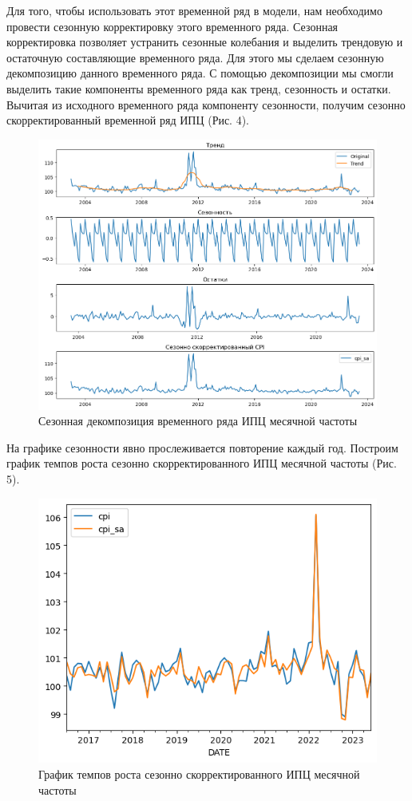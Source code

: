 \documentclass[a4paper, 14pt]{extarticle}
\begin{document}
	Для того, чтобы использовать этот временной ряд в модели, нам необходимо провести сезонную корректировку этого временного ряда. Сезонная корректировка позволяет устранить сезонные колебания и выделить трендовую и остаточную составляющие временного ряда. Для этого мы сделаем сезонную декомпозицию данного временного ряда. С помощью декомпозиции мы смогли выделить такие компоненты временного ряда как тренд, сезонность и остатки. Вычитая из исходного временного ряда компоненту сезонности, получим сезонно скорректированный временной ряд ИПЦ (Рис. 4).
	\begin{figure}[tph!]
		\centering
		\includegraphics[scale=0.5]{images/pic_04}
		\caption[Рис. 4]{Сезонная декомпозиция временного ряда ИПЦ месячной частоты}
		\label{fig:pic04}
	\end{figure}
	
	На графике сезонности явно прослеживается повторение каждый год.
	Построим график темпов роста сезонно скорректированного ИПЦ месячной частоты (Рис. 5).
	
	\begin{figure}[bph!]
		\centering
		\includegraphics[scale=0.8]{images/pic_05}
		\caption[Рис. 5]{График темпов роста сезонно скорректированного ИПЦ месячной частоты}
		\label{fig:pic05}
	\end{figure}
	
\end{document}
